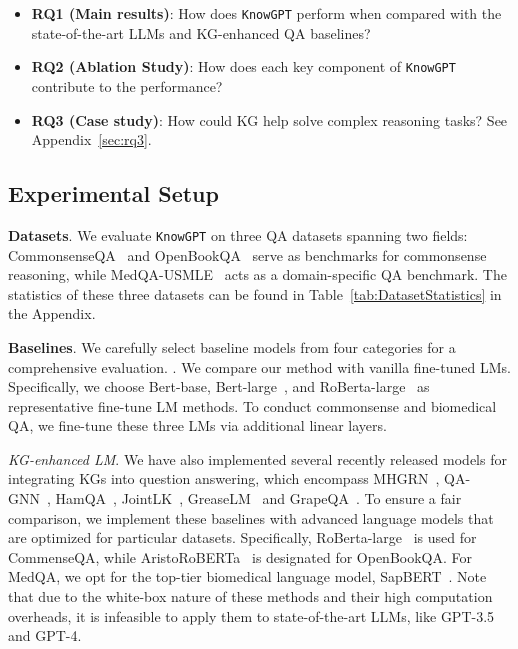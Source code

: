 \documentclass{article}
\theoremstyle{boldremark}
\begin{document}
\begin{itemize} [leftmargin=*]
    \item \textbf{RQ1 (Main results)}:  How does \texttt{KnowGPT} perform when compared with the state-of-the-art LLMs and KG-enhanced QA baselines? 
    \item \textbf{RQ2 (Ablation Study)}: How does each key component of \texttt{KnowGPT} contribute to the performance?
    \item \textbf{RQ3 (Case study)}: How could KG help solve complex reasoning tasks? See Appendix~\ref{sec:rq3}.
\end{itemize}
\subsection{Experimental Setup}
{\bf Datasets}.
We evaluate \texttt{KnowGPT} on three QA datasets spanning two fields: CommonsenseQA~\cite{CommonsenseQA} and OpenBookQA~\cite{mihaylov2018can} serve as benchmarks for commonsense reasoning, while MedQA-USMLE~\cite{app11146421} acts as a domain-specific QA benchmark. The statistics of these three datasets can be found in Table~\ref{tab:DatasetStatistics} in the Appendix.

{\bf Baselines}.
We carefully select baseline models from four categories for a comprehensive evaluation.
.
We compare our method with vanilla fine-tuned LMs. Specifically, we choose Bert-base, Bert-large~\cite{devlin2018bert}, and RoBerta-large~\cite{liu2019roberta} as representative fine-tune LM methods. To conduct commonsense and biomedical QA, we fine-tune these three LMs via additional linear layers. 

\noindent \textit{KG-enhanced LM}.
We have also implemented several recently released models for integrating KGs into question answering, which encompass MHGRN~\cite{MHGRN}, QA-GNN~\cite{QA-GNN}, HamQA~\cite{dong2023hierarchy}, JointLK~\cite{sun2021jointlk}, GreaseLM~\cite{zhang2022greaselm} and GrapeQA~\cite{taunk2023grapeqa}. 
To ensure a fair comparison, we implement these baselines with advanced language models that are optimized for particular datasets. 
Specifically, RoBerta-large~\cite{liu2019roberta} is used for CommenseQA, while AristoRoBERTa~\cite{clark2020f} is designated for OpenBookQA. For MedQA, we opt for the top-tier biomedical language model, SapBERT~\cite{liu2020self}. Note that due to the white-box nature of these methods and their high computation overheads, it is infeasible to apply them to state-of-the-art LLMs, like GPT-3.5 and GPT-4.
\end{document}
